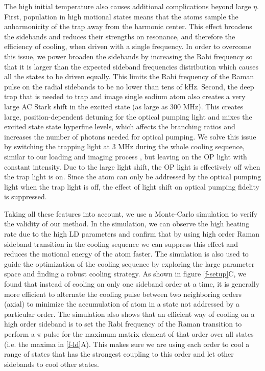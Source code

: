 \documentclass[aps,prl,twocolumn,groupedaddress]{revtex4-1}
\begin{document}
The high initial temperature also causes additional complications beyond large $\eta$.
First, population in high motional states means that the atoms sample
the anharmonicity of the trap away from the harmonic center.
This effect broadens the sidebands and reduces their strengths on resonance,
and therefore the efficiency of cooling, when driven with a single frequency.
In order to overcome this issue, we power broaden the sidebands by increasing the Rabi frequency
so that it is larger than the expected sideband frequencies distribution
which causes all the states to be driven equally.
This limits the Rabi frequency of the Raman pulse on the radial sidebands to be no lower
than tens of kHz.
Second, the deep trap that is needed to trap and image single sodium atom also creates
a very large AC Stark shift in the excited state (as large as 300 MHz).
This creates large, position-dependent detuning for the optical pumping light and mixes the excited state state hyperfine levels,
which affects the branching ratios and increases the number of photons needed for optical pumping.
We solve this issue by switching the trapping light at 3 MHz
during the whole cooling sequence, similar to our loading and imaging process
\cite{Hutzler2017-LightShifts}, but leaving on the OP light with constant intensity.
Due to the large light shift, the OP light is effectively off when the trap light is on.
Since the atom can only be addressed by the optical pumping light when the trap light is off,
the effect of light shift on optical pumping fidelity is suppressed.

Taking all these features into account, we use a Monte-Carlo simulation to verify
the validity of our method.
In the simulation, we can observe the high heating rate due to the high LD parameters
and confirm that by using high order Raman sideband transition in the cooling sequence we can
suppress this effect and reduces the motional energy of the atom faster.
The simulation is also used to guide the optimization of the cooling sequence by exploring the
large parameter space and finding a robust cooling strategy.
As shown in figure \ref{f-setup}C, we found that instead of cooling on only one sideband order
at a time, it is generally more efficient to alternate the cooling pulse between two
neighboring orders (axial) to minimize the accumulation of atom in a state
not addressed by a particular order.
The simulation also shows that an efficient way of cooling on a high order sideband is
to set the Rabi frequency of the Raman transition to perform a $\pi$ pulse for the maximum matrix element of that order over all states (i.e. the maxima in \ref{f-ld}A).
This makes sure we are using each order to cool a range of states that has the strongest
coupling to this order and let other sidebands to cool other states.
\end{document}
